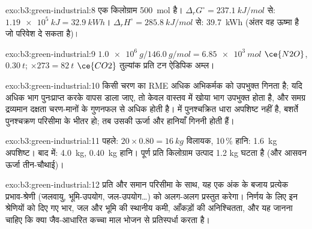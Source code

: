 \begin{solution}{exo:b3:green-industrial:8}
एक किलोग्राम \qty{500}{mol} है। $\Delta_rG^\circ = \qty{237.1}{kJ/mol}$ से: $\qty{1.19e5}{kJ} = \qty{32.9}{kWh}$। $\Delta_rH^\circ = \qty{285.8}{kJ/mol}$ से: \qty{39.7}{kWh}
(अंतर वह ऊष्मा है जो परिवेश दे सकता है)।
\end{solution}

\begin{solution}{exo:b3:green-industrial:9}
$\qty{1.0e6}{g}/\qty{146.0}{g/mol} = \qty{6.85e3}{mol}$ $\ce{N2O}$, $\qty{0.30}{t}$; $\times 273 = \qty{82}{t}$ $\ce{CO2}$ तुल्यांक प्रति टन ऐडिपिक अम्ल।
\end{solution}

\begin{solution}{exo:b3:green-industrial:10}
किसी चरण का RME अधिक अभिकर्मक को उपभुक्त गिनता है; यदि अधिक भाग पुनःप्राप्त करके
वापस डाला जाए, तो केवल वास्तव में खोया भाग उपभुक्त होता है, और समग्र द्रव्यमान
दक्षता चरण-मानों के गुणनफल से अधिक होती है।  में
पुनश्चक्रित धारा अपशिष्ट नहीं है, बशर्ते पुनश्चक्रण परिसीमा के भीतर हो;
तब उसकी ऊर्जा और हानियाँ गिननी होती हैं।
\end{solution}

\begin{solution}{exo:b3:green-industrial:11}
पहले: $20 \times 0.80 = \qty{16}{kg}$ विलायक, 10\,\% हानि: \qty{1.6}{kg} अपशिष्ट। बाद में: \qty{4.0}{kg}, \qty{0.40}{kg} हानि।
पूर्ण  प्रति किलोग्राम उत्पाद 1.2 kg घटता है (और आसवन
ऊर्जा तीन-चौथाई)।
\end{solution}

\begin{solution}{exo:b3:green-industrial:12}
प्रति  और समान परिसीमा के साथ, यह एक अंक के बजाय प्रत्येक प्रभाव-श्रेणी
(जलवायु, भूमि-उपयोग, जल-उपयोग\dots) को अलग-अलग प्रस्तुत करेगा।
निर्णय के लिए इन श्रेणियों को दिए गए भार, जल और भूमि की स्थानीय कमी,
आँकड़ों की अनिश्चितता, और यह जानना चाहिए कि क्या जैव-आधारित कच्चा माल
भोजन से प्रतिस्पर्धा करता है।
\end{solution}

